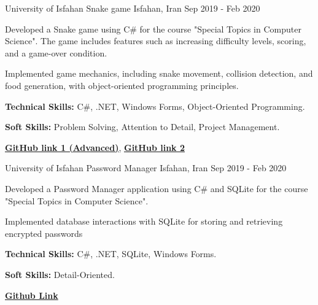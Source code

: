 \begin{cventries}
	\cventry
	{University of Isfahan} %
	{Snake game} %
	{Isfahan, Iran} %
	{Sep 2019 - Feb 2020} %
	{
		\begin{cvitems} %
			\item {Developed a Snake game using C\# for the course "Special Topics in Computer Science". The game includes features such as increasing difficulty levels, scoring, and a game-over condition.}
			\item {Implemented game mechanics, including snake movement, collision detection, and food generation, with object-oriented programming principles.}
			\item {\textbf{Technical Skills:} C\#, .NET, Windows Forms, Object-Oriented Programming.}
			\item {\textbf{Soft Skills:} Problem Solving, Attention to Detail, Project Management.}
			\item \href{https://github.com/xmsa/The-Snake-Game-Advanced}{\textbf{GitHub link 1 (Advanced)}}, \href{https://github.com/xmsa/The_Snake_game}{\textbf{GitHub link 2}}
		\end{cvitems}
	}
	
	
	\cventry
	{University of Isfahan} %
	{Password Manager} %
	{Isfahan, Iran} %
	{Sep 2019 - Feb 2020} %
	{
		\begin{cvitems} %
			\item {Developed a Password Manager application using C\# and SQLite for the course "Special Topics in Computer Science". }
			\item {Implemented database interactions with SQLite for storing and retrieving encrypted passwords}
			\item {\textbf{Technical Skills:} C\#, .NET, SQLite, Windows Forms.}
			\item {\textbf{Soft Skills:} Detail-Oriented. }
			\item \href{https://github.com/xmsa/manpass}{\textbf{Github Link}}
		\end{cvitems}		
	}
	

\end{cventries}

